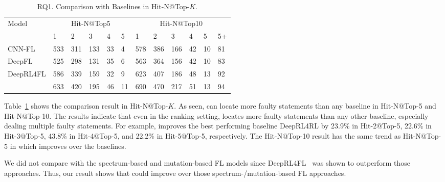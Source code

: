 \begin{table}[t]
	\caption{RQ1. Comparison with Baselines in Hit-N@Top-$K$.}
        \vspace{-6pt}
	{\small
		\begin{center}
			\renewcommand{\arraystretch}{1}
			\begin{tabular}{p{1.5cm}<{\centering}|p{0.3cm}<{\centering}|p{0.3cm}<{\centering}|p{0.3cm}<{\centering}|p{0.2cm}<{\centering}|p{0.2cm}<{\centering}|p{0.3cm}<{\centering}|p{0.3cm}<{\centering}|p{0.3cm}<{\centering}|p{0.2cm}<{\centering}|p{0.2cm}<{\centering}|p{0.2cm}<{\centering}}
				\hline
				\multirow{2}{*}{Model}    & \multicolumn{5}{c|}{Hit-N@Top5}& \multicolumn{6}{c}{Hit-N@Top10}\\
				\cline{2-12}
											 &1&2&3&4&5&1&2&3&4&5&5+\\
				
				\hline
				CNN-FL      & 533 & 311 & 133 & 33 & 4 & 578 & 386 & 166 & 42 & 10 & 81 \\
				DeepFL		& 525 & 298 & 131 & 35 & 6 & 563 & 364 & 156 & 42 & 10 & 83 \\
				DeepRL4FL	& 586 & 339 & 159 & 32 & 9 & 623 & 407 & 186 & 48 & 13 & 92 \\
				\hline
				\tool       & 633 & 420 & 195 & 46 & 11& 690 & 470 & 217 & 51 & 13 & 94 \\
				\hline
			\end{tabular}
			
			\label{fig:rq1-2}
		\end{center}
	}
\end{table}

Table~\ref{fig:rq1-2} shows the comparison result in Hit-N@Top-$K$.
As seen, {\tool} can locate more faulty statements than any baseline
in Hit-N@Top-5 and Hit-N@Top-10. The results indicate that even in the
ranking setting, {\tool} locates more faulty statements than
any other baseline, especially dealing multiple faulty statements. For
example, {\tool} improves the best performing baseline DeepRL4RL by
23.9\% in Hit-2@Top-5, 22.6\% in Hit-3@Top-5, 43.8\% in Hit-4@Top-5,
and 22.2\% in Hit-5@Top-5, respectively. The Hit-N@Top-10 result has
the same trend as Hit-N@Top-5 in which {\tool} improves over the
baselines.

We did not compare with the spectrum-based and mutation-based FL
models since DeepRL4FL~\cite{icse21-fl} was shown to outperform
those approaches. Thus, our result shows that {\tool}
could improve over those spectrum-/mutation-based FL approaches.
